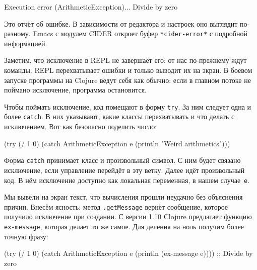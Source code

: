 
\begin{english}
  \begin{text}
Execution error (ArithmeticException)...
Divide by zero
  \end{text}
\end{english}

Это отчёт об ошибке. В зависимости от редактора и настроек оно выглядит
по-разному. Emacs с модулем CIDER откроет буфер \texttt{*cider\--error*}
с подробной информацией.


Заметим, что исключение в REPL не завершает его: от нас по-прежнему ждут
команды. REPL перехватывает ошибки и только выводит их на экран. В боевом
запуске программы на Clojure ведут себя как обычно: если в главном потоке не
поймано исключение, программа остановится.

Чтобы поймать исключение, код помещают в форму \verb|try|. За ним следует одна и
более \verb|catch|. В них указывают, какие классы перехватывать и что делать с
исключением. Вот как безопасно поделить число:


\begin{english}
  \begin{clojure}
(try
  (/ 1 0)
  (catch ArithmeticException e
    (println "Weird arithmetics")))
  \end{clojure}
\end{english}

Форма \verb|catch| принимает класс и произвольный символ. С ним будет связано
исключение, если управление перейдёт в эту ветку. Далее идёт произвольный код. В
нём исключение доступно как локальная переменная, в нашем случае~\verb|e|.


Мы вывели на экран текст, что вычисления прошли неудачно без объяснения
причин. Внесём ясность: метод \verb|.getMessage| вернёт сообщение, которое
получило исключение при создании. С версии 1.10 Clojure предлагает функцию
\verb|ex-message|, которая делает то же самое. Для деления на ноль получим более
точную фразу:

\begin{english}
  \begin{clojure}
(try
  (/ 1 0)
  (catch ArithmeticException e
    (println (ex-message e))))
;; Divide by zero
  \end{clojure}
\end{english}

